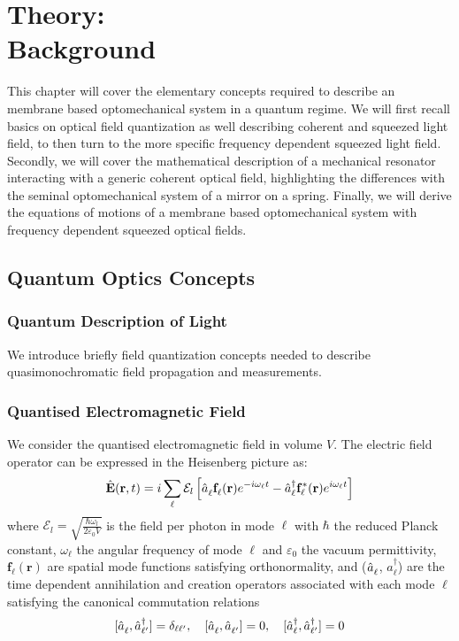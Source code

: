 \newcommand{\adag}[1]{\hat{a}_{#1}^\dagger}
\newcommand{\aop}[1]{\hat{a}_{#1\vphantom{\dagger}}}
\chapter{Theory: \\ Background}
This chapter will cover the elementary concepts required to describe an membrane based optomechanical system in a quantum regime. We will first recall basics on optical field quantization as well describing coherent and squeezed light field, to then turn to the more specific frequency dependent squeezed light field. Secondly, we will cover the mathematical description of a mechanical resonator interacting with a generic coherent optical field, highlighting the differences with the seminal optomechanical system of a mirror on a spring. Finally, we will derive the equations of motions of a membrane based optomechanical system with frequency dependent squeezed optical fields. 
\minitoc
\newpage
\section{Quantum Optics Concepts}
\subsection{Quantum Description of Light}
We introduce briefly field quantization concepts needed to describe quasimonochromatic field propagation and measurements.

\subsection*{Quantised Electromagnetic Field}

We consider the quantised electromagnetic field in volume $V$. The electric field operator can be expressed in the Heisenberg picture as:
\begin{equation}
\hat{\mathbf{E}}(\mathbf{r}, t) = i \sum_{ \ell} \mathcal{E}_l \left[\hat{a}_{\ell}^{\vphantom{dagger}}\mathbf{f}_{\ell}^{\vphantom{*}}(\mathbf{r})e^{-i\omega_{\ell}t} - \hat{a}_{\ell}^\dagger \mathbf{f}_{\ell}^*(\mathbf{r}) e^{i\omega_{\ell}t}\right]
\end{equation}
where $\mathcal{E}_l = \sqrt{\frac{\hbar \omega_l}{2 \varepsilon_0 V}}$ is the field per photon in mode $\ell$ with $\hbar$ the reduced Planck constant, $\omega_\ell$ the angular frequency of mode $\ell$ and $\varepsilon_0$ the vacuum permittivity, $\mathbf{f}_{\ell}(\mathbf{r})$ are spatial mode functions satisfying orthonormality, and ($\hat{a}_{\ell}^{\vphantom{\dagger}}$, $\hat{a}_{\ell}^{\dagger}$) are the time dependent annihilation and creation operators associated with each mode $\ell$ satisfying the canonical commutation relations
\[
[\hat{a}_{\ell}^{\vphantom{\dagger}}, \hat{a}_{\ell'}^\dagger] = \delta_{\ell \ell'} , \quad
[\hat{a}_{\ell}^{\vphantom{\dagger}}, \hat{a}_{\ell'}^{\vphantom{\dagger}} ] = 0, \quad [\hat{a}_{\ell}^\dagger , \hat{a}_{\ell'}^\dagger ] = 0  
\]
